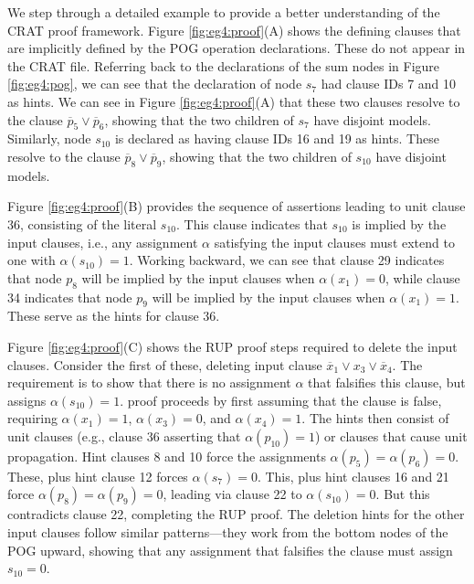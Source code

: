 \documentclass[letterpaper,USenglish,cleveref, autoref, thm-restate]{lipics-v2021}
\newcommand{\obar}[1]{\overline{#1}}
\newcommand{\assign}{\alpha}
\begin{document}
We step through a detailed example to provide a better understanding of the CRAT proof framework.
Figure
\ref{fig:eg4:proof}(A) shows the defining clauses that are implicitly
defined by the POG operation declarations.  These do not appear in the
CRAT file.  Referring back to the declarations of the sum nodes in
Figure \ref{fig:eg4:pog}, we can see that the declaration of node
$s_7$ had clause IDs 7 and 10 as hints.  We can see in Figure
\ref{fig:eg4:proof}(A) that these two clauses resolve to the clause
$\obar{p}_5 \lor \obar{p}_6$, showing that the two children of $s_7$
have disjoint models.  Similarly, node $s_{10}$ is declared as having
clause IDs 16 and 19 as hints.  These resolve to the clause
$\obar{p}_8 \lor \obar{p}_9$, showing that the two children of
$s_{10}$ have disjoint models.

Figure \ref{fig:eg4:proof}(B) provides the sequence of assertions
leading to unit clause 36, consisting of the literal $s_{10}$.  This clause indicates that $s_{10}$ is implied by the input clauses, i.e.,
any assignment $\assign$
satisfying the input clauses must extend to one with $\assign(s_{10}) = 1$.
Working backward, we can see that
clause 29 indicates that node $p_8$ will be implied by the input
clauses when $\assign(x_1) = 0$, while clause 34 indicates that node $p_9$ will
be implied by the input clauses when $\assign(x_1) = 1$.  These serve as the
hints for clause 36.

Figure \ref{fig:eg4:proof}(C) shows the RUP proof steps required to
delete the input clauses.  Consider the first of these, deleting
input clause $\obar{x}_1 \lor x_3 \lor \obar{x}_4$.  The requirement is to show
that there is no assignment $\assign$ that falsifies this clause, but assigns $\assign(s_{10}) = 1$.
proof proceeds by first assuming that the clause is false, requiring
$\assign(x_1) = 1$, $\assign(x_3) = 0$, and $\assign(x_4) = 1$.  The hints then consist of unit
clauses (e.g., clause 36 asserting that $\alpha(p_{10}) = 1$) or
clauses that cause unit propagation.  Hint clauses 8 and 10 force the
assignments $\assign(p_5) = \assign(p_6) = 0$.  These, plus hint clause 12 forces
$\assign(s_7) = 0$.  This, plus hint clauses 16 and 21 force $\assign(p_8) = \assign(p_9) = 0$, leading
via clause 22 to $\assign(s_10) = 0$.  But this contradicts clause 22,
completing the RUP proof.  The deletion hints for the other input
clauses follow similar patterns---they work from the bottom nodes of
the POG upward, showing that any assignment that falsifies the clause
must assign $s_{10} = 0$.
\end{document}
